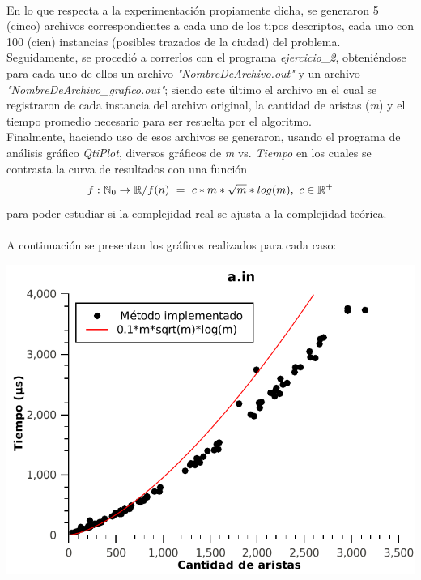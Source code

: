 \paragraph{}
En lo que respecta a la experimentación propiamente dicha, se generaron 5 (cinco) archivos correspondientes a cada uno de los tipos descriptos, cada uno con 100 (cien) instancias (posibles trazados de la ciudad) del problema. Seguidamente, se procedió a correrlos con el programa \textit{ejercicio\_2},  obteniéndose para cada uno de ellos un archivo \textit{"NombreDeArchivo.out"} y un archivo \textit{"NombreDeArchivo\_grafico.out"}; siendo este último el archivo en el cual se registraron de cada instancia del archivo original, la cantidad de aristas (\textit{m}) y el tiempo promedio necesario para ser resuelta por el algoritmo. \\
Finalmente, haciendo uso de esos archivos se generaron, usando el programa de análisis gráfico \textit{QtiPlot}, diversos gráficos de \textit{m} vs. \textit{Tiempo} en los cuales se contrasta la curva de resultados con una función 
	$$f: \mathbb{N}_0 \rightarrow \mathbb{R} / f(n)\ =\ c * m * \sqrt{m} * log(m),\ c \in \mathbb{R}^+$$
para poder estudiar si la complejidad real se ajusta a la complejidad teórica.

\paragraph{}
A continuación se presentan los gráficos realizados para cada caso:



 \vspace*{1cm}
\label{GraphA}
\hspace*{-2.1cm}\includegraphics[width=475pt]{../ej2/pruebas_graficos/GraphA.pdf}

